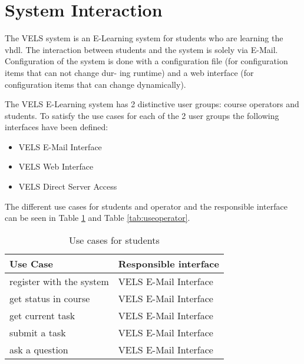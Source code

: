 \section{System Interaction} \label{system_interaction}
The VELS system is an E-Learning system for students who are learning the \gls{vhdl}. The
interaction between students and the system is solely via E-Mail. Configuration of the
system is done with a configuration file (for configuration items that can not change dur-
ing runtime) and a web interface (for configuration items that can change dynamically).

The VELS E-Learning system has 2 distinctive user groups: course operators and students. 
To satisfy the use cases for each of the 2 user groups the following interfaces have
been defined:
\begin{itemize}
\item VELS E-Mail Interface
\item VELS Web Interface
\item VELS Direct Server Access
\end{itemize} 

The different use cases for students and operator and the responsible interface can be 
seen in Table \ref{tab:usestudent} and Table \ref{tab:useoperator}.

\begin{table}[h]
\centering
\begin{tabular}{||l | l||} 
    \hline
    Use Case & Responsible interface \\ [0.5ex] 
    \hline\hline
    register with the system & VELS E-Mail Interface
    \\
    \hline
    get status in course & VELS E-Mail Interface 
    \\
    \hline
    get current task & VELS E-Mail Interface 
    \\
    \hline
    submit a task & VELS E-Mail Interface
    \\
    \hline
    ask a question & VELS E-Mail Interface
    \\
    \hline
\end{tabular}
\caption{Use cases for students}
\label{tab:usestudent}
\end{table}


